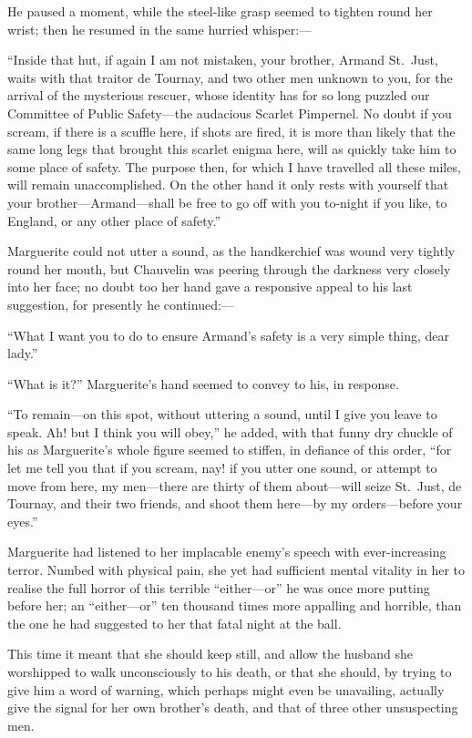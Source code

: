 \documentclass[paper=5.5in:8.5in,BCOR=7mm,twoside,DIV=calc,12pt,usegeometry,chapterprefix,endperiod,headings=big]{scrbook}
\begin{document}
He paused a moment, while the steel-like grasp seemed to tighten round her wrist; then he resumed in the same hurried whisper:---

\enquote{Inside that hut, if again I am not mistaken, your brother, Armand St.~Just, waits with that traitor de Tournay, and two other men unknown to you, for the arrival of the mysterious rescuer, whose identity has for so long puzzled our Committee of Public Safety---the audacious Scarlet Pimpernel. No doubt if you scream, if there is a scuffle here, if shots are fired, it is more than likely that the same long legs that brought this scarlet enigma here, will as quickly take him to some place of safety. The purpose then, for which I have travelled all these miles, will remain unaccomplished. On the other hand it only rests with yourself that your brother---Armand---shall be free to go off with you to-night if you like, to England, or any other place of safety.}

Marguerite could not utter a sound, as the handkerchief was wound very tightly round her mouth, but Chauvelin was peering through the darkness very closely into her face; no doubt too her hand gave a responsive appeal to his last suggestion, for presently he continued:---

\enquote{What I want you to do to ensure Armand's safety is a very simple thing, dear lady.}

\enquote{What is it?} Marguerite's hand seemed to convey to his, in response.

\enquote{To remain---on this spot, without uttering a sound, until I give you leave to speak. Ah! but I think you will obey,} he added, with that funny dry chuckle of his as Marguerite's whole figure seemed to stiffen, in defiance of this order, \enquote{for let me tell you that if you scream, nay! if you utter one sound, or attempt to move from here, my men---there are thirty of them about---will seize St.~Just, de Tournay, and their two friends, and shoot them here---by my orders---before your eyes.}

Marguerite had listened to her implacable enemy's speech with ever-increasing terror. Numbed with physical pain, she yet had sufficient mental vitality in her to realise the full horror of this terrible \enquote{either---or} he was once more putting before her; an \enquote{either---or} ten thousand times more appalling and horrible, than the one he had suggested to her that fatal night at the ball.

This time it meant that she should keep still, and allow the husband she worshipped to walk unconsciously to his death, or that she should, by trying to give him a word of warning, which perhaps might even be unavailing, actually give the signal for her own brother's death, and that of three other unsuspecting men.
\end{document}
